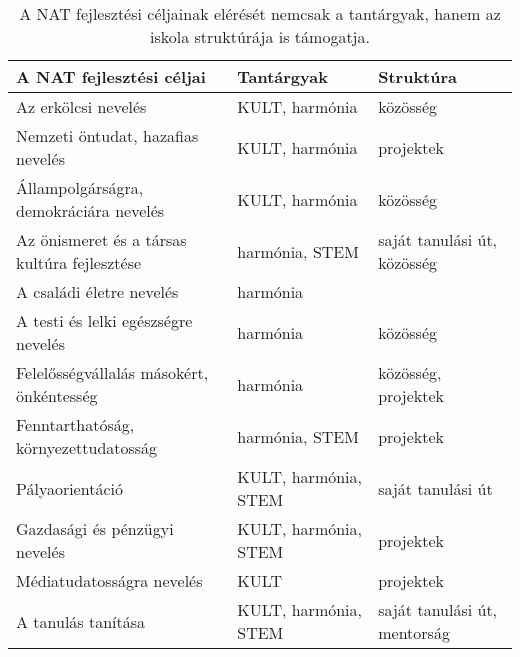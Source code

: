 \begin{table}

  \begin{tabular}{p{5cm}|>{\raggedright}p{3cm}|p{3cm}}

    \textbf{A NAT fejlesztési céljai}               & \textbf{Tantárgyak}  & \textbf{Struktúra}           \\
    \hline
    Az erkölcsi nevelés                          & KULT, harmónia       & közösség                     \\ \hline
    Nemzeti öntudat, hazafias nevelés            & KULT, harmónia       & projektek                    \\ \hline
    Állampolgárságra, demokráciára nevelés       & KULT, harmónia       & közösség                     \\ \hline
    Az önismeret és a társas kultúra fejlesztése & harmónia, STEM & saját
    tanulási út, közösség                                                                              \\ \hline
    A családi életre nevelés                     & harmónia             &                              \\ \hline
    A testi és lelki egészségre nevelés          & harmónia             & közösség                     \\ \hline
    Felelősségvállalás másokért, önkéntesség     & harmónia             & közösség, pro\-jek\-tek      \\
    \hline
    Fenntarthatóság, környezettudatosság         & harmónia, STEM       & projektek                    \\ \hline
    Pályaorientáció                              & KULT, harmónia, STEM & saját tanulási út            \\ \hline
    Gazdasági és pénzügyi nevelés                & KULT, harmónia, STEM & projektek                    \\ \hline
    Médiatudatosságra nevelés                    & KULT                 & projektek                    \\ \hline
    A tanulás tanítása                           & KULT, harmónia, STEM & saját tanulási út, mentorság \\

  \end{tabular}
  \caption{A NAT fejlesztési céljainak elérését nemcsak a tantárgyak, hanem az
    iskola struktúrája is támogatja.}
  \label{tbl:nat_fejlesztesi}
\end{table}

